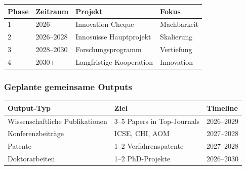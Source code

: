 \documentclass[11pt,a4paper]{article}
\begin{document}
\begin{table}[h]
\centering
\begin{tabular}{llll}
\toprule
\textbf{Phase} & \textbf{Zeitraum} & \textbf{Projekt} & \textbf{Fokus} \\
\midrule
1 & 2026 & Innovation Cheque & Machbarkeit \\
2 & 2026--2028 & Innosuisse Hauptprojekt & Skalierung \\
3 & 2028--2030 & Forschungsprogramm & Vertiefung \\
4 & 2030+ & Langfristige Kooperation & Innovation \\
\bottomrule
\end{tabular}
\end{table}

\subsubsection{Geplante gemeinsame Outputs}

\begin{table}[h]
\centering
\begin{tabular}{lll}
\toprule
\textbf{Output-Typ} & \textbf{Ziel} & \textbf{Timeline} \\
\midrule
Wissenschaftliche Publikationen & 3--5 Papers in Top-Journals & 2026--2029 \\
Konferenzbeiträge & ICSE, CHI, AOM & 2027--2028 \\
Patente & 1--2 Verfahrenspatente & 2027--2028 \\
Doktorarbeiten & 1--2 PhD-Projekte & 2026--2030 \\
\bottomrule
\end{tabular}
\end{table}
\end{document}

